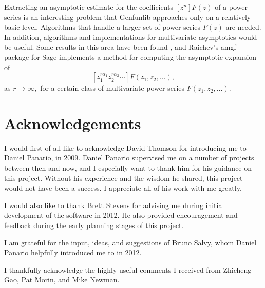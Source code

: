 \documentclass{article}
\theoremstyle{plain}
\begin{document}
Extracting an asymptotic estimate for the coefficients \( [z^n]F(z) \) of a
power series is an interesting problem that Genfunlib approaches only on a
relatively basic level.
Algorithms that handle a larger set of power series \( F(z) \) are needed.
In addition, algorithms and implementations for multivariate asymptotics would
be useful.
Some results in this area have been found
\cite{several, raichev},
and Raichev's amgf package for Sage implements a method for computing the
asymptotic expansion of
\[
  [z_1^{r \alpha_1} z_2^{r \alpha_2} \cdots]F(z_1, z_2, \dots),
\]
as \( r \rightarrow \infty, \) for a certain class of multivariate power series
\( F(z_1, z_2, \dots). \)

\section*{Acknowledgements}

I would first of all like to acknowledge David Thomson for introducing me to
Daniel Panario, in 2009.
Daniel Panario supervised me on a number of projects between then and now,
and I especially want to thank him for his guidance on this project.
Without his experience and the wisdom he shared, this project would not have
been a success.
I appreciate all of his work with me greatly.

I would also like to thank Brett Stevens for advising me during initial
development of the software in 2012.
He also provided encouragement and feedback during the early planning stages of
this project.

I am grateful for the input, ideas, and suggestions of Bruno Salvy, whom
Daniel Panario helpfully introduced me to in 2012.

I thankfully acknowledge the highly useful comments I received from
Zhicheng Gao, Pat Morin, and Mike Newman.



\end{document}
